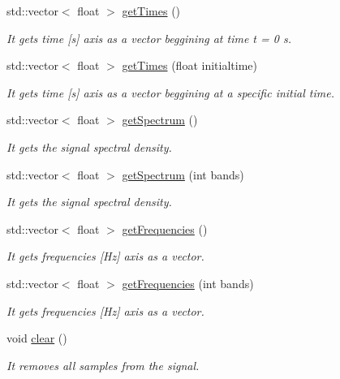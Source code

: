 \begin{DoxyCompactItemize}
std\+::vector$<$ float $>$ \hyperlink{class_audio_signal_afff46a70335800ba93ae513bdea7e4c9}{get\+Times} ()
\begin{DoxyCompactList}\small\item\em It gets time \mbox{[}s\mbox{]} axis as a vector beggining at time t = 0 s. \end{DoxyCompactList}\item 
std\+::vector$<$ float $>$ \hyperlink{class_audio_signal_aa04d6fcd3219f4bb8d77916c60d85ad2}{get\+Times} (float initialtime)
\begin{DoxyCompactList}\small\item\em It gets time \mbox{[}s\mbox{]} axis as a vector beggining at a specific initial time. \end{DoxyCompactList}\item 
std\+::vector$<$ float $>$ \hyperlink{class_audio_signal_a1c1330b11b635cfafe2edb75fd0d2e70}{get\+Spectrum} ()
\begin{DoxyCompactList}\small\item\em It gets the signal spectral density. \end{DoxyCompactList}\item 
std\+::vector$<$ float $>$ \hyperlink{class_audio_signal_ae49bd4dc391e6ae0e8a673ff8d5089fb}{get\+Spectrum} (int bands)
\begin{DoxyCompactList}\small\item\em It gets the signal spectral density. \end{DoxyCompactList}\item 
std\+::vector$<$ float $>$ \hyperlink{class_audio_signal_a4e45a4b1adc16a9cbd65501efafb6ded}{get\+Frequencies} ()
\begin{DoxyCompactList}\small\item\em It gets frequencies \mbox{[}Hz\mbox{]} axis as a vector. \end{DoxyCompactList}\item 
std\+::vector$<$ float $>$ \hyperlink{class_audio_signal_a9b7d7a655913f579c0df8b2639b3ce56}{get\+Frequencies} (int bands)
\begin{DoxyCompactList}\small\item\em It gets frequencies \mbox{[}Hz\mbox{]} axis as a vector. \end{DoxyCompactList}\item 
\mbox{\label{class_audio_signal_a69279f3fee0a4fe11d3e9a8361615a96}} 
void \hyperlink{class_audio_signal_a69279f3fee0a4fe11d3e9a8361615a96}{clear} ()
\begin{DoxyCompactList}\small\item\em It removes all samples from the signal. \end{DoxyCompactList}\end{DoxyCompactItemize}
